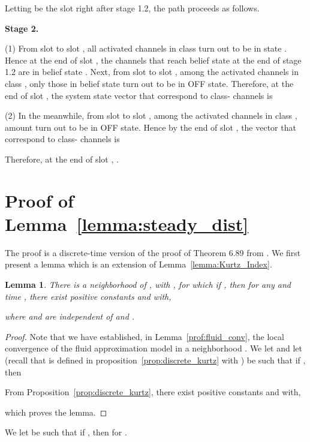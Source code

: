 \documentclass[11pt,twocolumn]{IEEEtran}
\newtheorem{lemma}{Lemma}
\begin{document}
Letting  be the slot right after stage 1.2, the path proceeds as follows.
\vspace{7pt}

\noindent\textbf{Stage 2.}

\noindent(1) From slot  to slot , all activated channels in class  turn out to be in state . Hence at the end of slot , the channels that reach belief state  at the end of stage 1.2 are in belief state . Next, from slot  to slot , among the activated channels in class , only those in belief state   turn out to be in OFF state. Therefore, at the end of slot , the system state vector  that correspond to class- channels is


\noindent(2) In the meanwhile, from slot  to slot , among the activated channels in class ,  amount turn out to be in OFF state. Hence by the end of slot , the vector  that correspond to class- channels is



Therefore, at the end of slot ,  .
\vspace{10pt}


\section{Proof of Lemma~\ref{lemma:steady_dist}}
\label{appen:Invar_meas}

The proof is a discrete-time version of the proof of Theorem 6.89 from \cite{Weiss_LD}. We first present a lemma which is an extension of Lemma~\ref{lemma:Kurtz_Index}.
\begin{lemma}
\label{lemma:Kurtz_Index3}
There is a neighborhood  of , with , for which if , then for any  and time , there exist positive constants  and  with,

where  and  are independent of  and .
\end{lemma}

\begin{proof}
Note that we have established, in Lemma~\ref{prof:fluid_conv}, the local convergence of the fluid approximation model  in a neighborhood . We let  and let  (recall that  is defined in proposition~\ref{prop:discrete_kurtz} with ) be such that if , then


From Proposition~\ref{prop:discrete_kurtz}, there exist positive constants  and  with,

which proves the lemma.
\end{proof}\vspace{5pt}

We let  be such that if , then  for .
\end{document}
